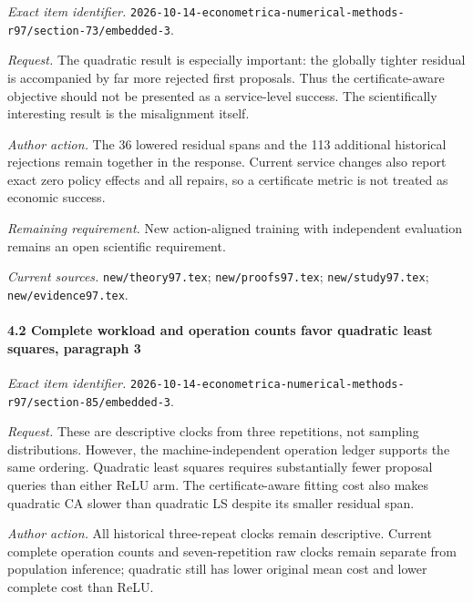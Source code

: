 \emph{Exact item identifier.} \nolinkurl{2026-10-14-econometrica-numerical-methods-r97/section-73/embedded-3}.

\par\emph{Request.} The quadratic result is especially important: the globally tighter residual is accompanied by far more rejected first proposals. Thus the certificate-aware objective should not be presented as a service-level success. The scientifically interesting result is the misalignment itself.

\par\emph{Author action.} The 36 lowered residual spans and the 113 additional historical rejections remain together in the response. Current service changes also report exact zero policy effects and all repairs, so a certificate metric is not treated as economic success.

\par\emph{Remaining requirement.} New action-aligned training with independent evaluation remains an open scientific requirement.

\par\emph{Current sources.} \nolinkurl{new/theory97.tex}; \nolinkurl{new/proofs97.tex}; \nolinkurl{new/study97.tex}; \nolinkurl{new/evidence97.tex}.

\paragraph{4.2 Complete workload and operation counts favor quadratic least squares, paragraph 3}

\emph{Exact item identifier.} \nolinkurl{2026-10-14-econometrica-numerical-methods-r97/section-85/embedded-3}.

\par\emph{Request.} These are descriptive clocks from three repetitions, not sampling distributions. However, the machine-independent operation ledger supports the same ordering. Quadratic least squares requires substantially fewer proposal queries than either ReLU arm. The certificate-aware fitting cost also makes quadratic CA slower than quadratic LS despite its smaller residual span.

\par\emph{Author action.} All historical three-repeat clocks remain descriptive. Current complete operation counts and seven-repetition raw clocks remain separate from population inference; quadratic still has lower original mean cost and lower complete cost than ReLU.

